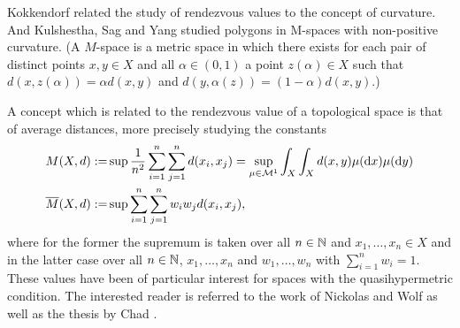 Kokkendorf \cite{kokkendorff} related the study of rendezvous values to the concept of curvature. And Kulshestha, Sag and Yang \cite{kulshestha:polygons} studied polygons in M-spaces with non-positive curvature. (A $M$-space is a metric space in which there exists for each pair of distinct points $x,y\in X$ and all $\alpha\in (0,1)$ a point $z(\alpha)\in X$ such that $d(x,z(\alpha))=\alpha d(x,y)$ and $d(y,\alpha(z))=(1-\alpha)d(x,y)$.)

A concept which is related to the rendezvous value of a topological space is that of average distances, more precisely studying the constants
\begin{align*}
	M(X,d):=&\sup\frac{1}{n^2}\sum_{i=1}^n\sum_{j=1}^nd(x_i,x_j)=\sup_{\mu\in\mathcal{M}^1}\int_X\int_X d(x,y)\mu(\mathrm{d}x)\mu(\mathrm{d}y)\\
	\overline{M}(X,d):=&\sup
	\sum_{i=1}^n\sum_{j=1}^nw_iw_jd(x_i,x_j),
\end{align*}
where for the former the supremum is taken over all $n\in\mathbb{N}$ and $x_1,\dots,x_n\in X$ and in the latter case over all $n\in \mathbb{N}$, $x_1,\dots,x_n$ and $w_1,\dots, w_n$ with $\sum_{i=1}^nw_i=1$. These values have been of particular interest for spaces with the quasihypermetric condition. The interested reader is referred to the work of Nickolas and Wolf \cite{nickolas-wolf:quasihypermetric1,nickolas-wolf:quasihypermetric2,nickolas-wolf:quasihypermetric3} as well as the thesis by Chad \cite{chad}. 